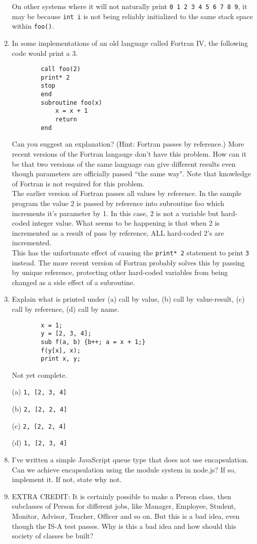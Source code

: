 \documentclass{article}
\begin{document}
\begin{enumerate}
    On other systems where it will not naturally print \texttt{0 1 2 3 4 5 6 7 8 9}, it may be because \texttt{int i} is not being reliably initialized to the same stack space within \texttt{foo()}.
    
    \setcounter{enumi}{7}
    \pagebreak
    \item In some implementations of an old language called Fortran IV, the following code would print a 3. 
    \begin{verbatim} 
        call foo(2)
        print* 2
        stop
        end
        subroutine foo(x)
            x = x + 1
            return
        end
    \end{verbatim}
    Can you suggest an explanation? (Hint: Fortran passes by reference.) More recent versions of the Fortran langauge don't have this problem. How can it be that two versions of the same language can give different results even though parameters are officially passed ``the same way". Note that knowledge of Fortran is not required for this problem.\\[.25in]
    The earlier version of Fortran passes all values by reference. In the sample program the value 2 is passed by reference into subroutine foo which increments it's parameter by 1. In this case, 2 is not a variable but hard-coded integer value. What seems to be happening is that when 2 is incremented as a result of pass by reference, ALL hard-coded 2's are incremented. \\[.1in]
    This has the unfortunate effect of causing the \texttt{print* 2} statement to print \texttt{3} instead. The more recent version of Fortran probably solves this by passing by unique reference, protecting other hard-coded variables from being changed as a side effect of a subroutine.
    \setcounter{enumi}{9}
    \pagebreak
    \item Explain what is printed under (a) call by value, (b) call by value-result, (c) call by reference, (d) call by name.
    \begin{verbatim}
        x = 1;
        y = [2, 3, 4];
        sub f(a, b) {b++; a = x + 1;}
        f(y[x], x);
        print x, y;
    \end{verbatim}
    Not yet complete.
        \item[(a)]
        \texttt{1, [2, 3, 4]}
        \item[(b)]
        \texttt{2, [2, 2, 4]}
        \item[(c)]
        \texttt{2, [2, 2, 4]}
        \item[(d)]
        \texttt{1, [2, 3, 4]}
    \pagebreak
    \item I've written a simple JavaScript queue type that does not use encapsulation. Can we achieve encapsulation using the module system in node.js? If so, implement it. If not, state why not.
    \pagebreak
    \item EXTRA CREDIT: It is certainly possible to make a Person class, then subclasses of Person for different jobs, like Manager, Employee, Student, Monitor, Advisor, Teacher, Officer and so on. But this is a bad idea, even though the IS-A test passes. Why is this a bad idea and how should this society of classes be built? \\[.1in]


\end{enumerate}
\end{document}
